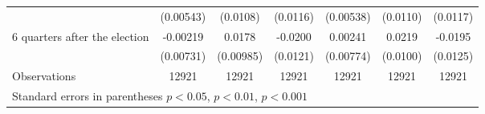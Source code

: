 \begin{table}[!ht]
\begin{tabular}{l*{6}{c}}
                    &   (0.00543)         &    (0.0108)         &    (0.0116)         &   (0.00538)         &    (0.0110)         &    (0.0117)         \\
[0,5em]
 6 quarters after the election&    -0.00219         &      0.0178         &     -0.0200         &     0.00241         &      0.0219\sym{*}  &     -0.0195         \\
                    &   (0.00731)         &   (0.00985)         &    (0.0121)         &   (0.00774)         &    (0.0100)         &    (0.0125)         \\
\hline
Observations        &       12921         &       12921         &       12921         &       12921         &       12921         &       12921         \\
\hline\hline
\multicolumn{7}{l}{\footnotesize Standard errors in parentheses \sym{*} \(p<0.05\), \sym{**} \(p<0.01\), \sym{***} \(p<0.001\)}\\
\end{tabular}
\end{table}
